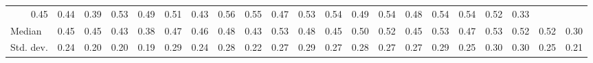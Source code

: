 \begin{tabular}{lllllllllllllllllllll}
  \multicolumn{1}{r}{0.45} &
  \multicolumn{1}{r}{0.44} &
  \multicolumn{1}{r}{0.39} &
  \multicolumn{1}{r}{0.53} &
  \multicolumn{1}{r}{0.49} &
  \multicolumn{1}{r}{0.51} &
  \multicolumn{1}{r}{0.43} &
  \multicolumn{1}{r}{0.56} &
  \multicolumn{1}{r}{0.55} &
  \multicolumn{1}{r}{0.47} &
  \multicolumn{1}{r}{0.53} &
  \multicolumn{1}{r}{0.54} &
  \multicolumn{1}{r}{0.49} &
  \multicolumn{1}{r}{0.54} &
  \multicolumn{1}{r}{0.48} &
  \multicolumn{1}{r}{0.54} &
  \multicolumn{1}{r}{0.54} &
  \multicolumn{1}{r}{0.52} &
  \multicolumn{1}{r}{0.33} \\
\multicolumn{1}{l}{\hspace{2em}Median } &
  \multicolumn{1}{|r}{0.45} &
  \multicolumn{1}{r}{0.45} &
  \multicolumn{1}{r}{0.43} &
  \multicolumn{1}{r}{0.38} &
  \multicolumn{1}{r}{0.47} &
  \multicolumn{1}{r}{0.46} &
  \multicolumn{1}{r}{0.48} &
  \multicolumn{1}{r}{0.43} &
  \multicolumn{1}{r}{0.53} &
  \multicolumn{1}{r}{0.48} &
  \multicolumn{1}{r}{0.45} &
  \multicolumn{1}{r}{0.50} &
  \multicolumn{1}{r}{0.52} &
  \multicolumn{1}{r}{0.45} &
  \multicolumn{1}{r}{0.53} &
  \multicolumn{1}{r}{0.47} &
  \multicolumn{1}{r}{0.53} &
  \multicolumn{1}{r}{0.52} &
  \multicolumn{1}{r}{0.52} &
  \multicolumn{1}{r}{0.30} \\
\multicolumn{1}{l}{\hspace{2em}Std. dev.} &
  \multicolumn{1}{|r}{0.24} &
  \multicolumn{1}{r}{0.20} &
  \multicolumn{1}{r}{0.20} &
  \multicolumn{1}{r}{0.19} &
  \multicolumn{1}{r}{0.29} &
  \multicolumn{1}{r}{0.24} &
  \multicolumn{1}{r}{0.28} &
  \multicolumn{1}{r}{0.22} &
  \multicolumn{1}{r}{0.27} &
  \multicolumn{1}{r}{0.29} &
  \multicolumn{1}{r}{0.27} &
  \multicolumn{1}{r}{0.28} &
  \multicolumn{1}{r}{0.27} &
  \multicolumn{1}{r}{0.27} &
  \multicolumn{1}{r}{0.29} &
  \multicolumn{1}{r}{0.25} &
  \multicolumn{1}{r}{0.30} &
  \multicolumn{1}{r}{0.30} &
  \multicolumn{1}{r}{0.25} &
  \multicolumn{1}{r}{0.21} \\
\cline{1-21}
\end{tabular}
